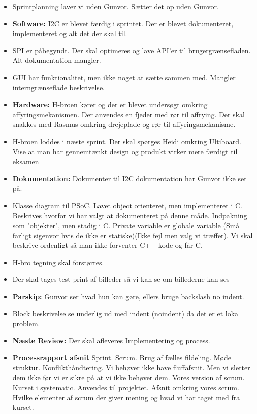 \documentclass{article}
\begin{document}
	\begin{itemize}
	\item Sprintplanning laver vi uden Gunvor. Sætter det op uden Gunvor.
	
	\item \textbf{Software: }I2C er blevet færdig i sprintet. Der er blevet dokumenteret, implementeret og alt det der skal til.
	\item SPI er påbegyndt. Der skal optimeres og lave API'er til brugergrænsefladen. Alt dokumentation mangler.
	\item GUI har funktionalitet, men ikke noget at sætte sammen med. Mangler interngrænseflade beskrivelse.
	\item \textbf{Hardware: }H-broen kører og der er blevet undersøgt omkring affyringsmekanismen. Der anvendes en fjeder med rør til affrying. Der skal snakkes med Rasmus omkring drejeplade og rør til affyringsmekanisme.
	\item  H-broen loddes i næste sprint. Der skal spørges Heidi omkring Ultiboard. Vise at man har gennemtænkt design og produkt virker mere færdigt til eksamen
	\item \textbf{Dokumentation: }Dokumenter til I2C dokumentation har Gunvor ikke set på.
	\item Klasse diagram til PSoC. Lavet object orienteret, men implementeret i C. Beskrives hvorfor vi har valgt at dokumenteret på denne måde. Indpakning som "objekter", men stadig i C. Private variable er globale variable (Små farligt sigenvor hvis de ikke er statiske)(Ikke fejl men valg vi træffer). Vi skal beskrive ordenligt så man ikke forventer C++ kode og får C.
	\item H-bro tegning skal forstørres. 
	\item Der skal tages test print af billeder så vi kan se om billederne kan ses
	\item \textbf{Parskip: } Gunvor ser hvad hun kan gøre, ellers bruge backslash no indent.
	\item Block beskrivelse se underlig ud med indent (noindent) da det er et loka problem.
	
	
	\item \textbf{Næste Review: } Der skal afleveres Implementering og process.
	\item \textbf{Processrapport afsnit }Sprint. Scrum. Brug af fælles fildeling. Møde struktur. Konflikthåndtering. 
	\subitem Vi behøver ikke have fluffafsnit. Men vi sletter dem ikke før vi er sikre på at vi ikke behøver dem.
	\subitem Vores version af scrum. Kurset i systematic. Anvendes til projektet. Afsnit omkring vores scrum. Hvilke elementer af scrum der giver mening og hvad vi har taget med fra kurset. 
	

\end{itemize}
\end{document}
